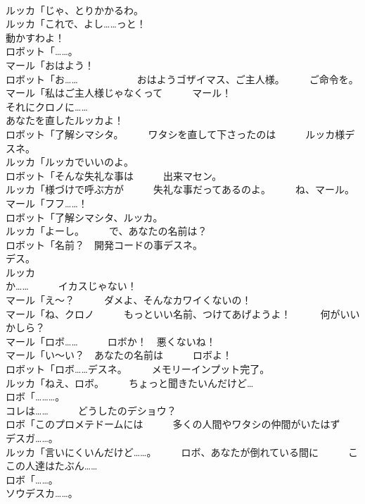 \documentclass[8pt]{extreport}
\begin{document}
\begin{CJK}{UTF8}{min}
\\	ルッカ「じゃ、とりかかるわ。	
\\	ルッカ「これで、よし……っと！	
\\	動かすわよ！	
\\	ロボット「……。	
\\	マール「おはよう！	
\\	ロボット「お……　　　　　　おはようゴザイマス、ご主人様。　　　ご命令を。	
\\	マール「私はご主人様じゃなくって　　　マール！	
\\	それにクロノに……	
\\	あなたを直したルッカよ！	
\\	ロボット「了解シマシタ。　　　ワタシを直して下さったのは　　　ルッカ様デスネ。	
\\	ルッカ「ルッカでいいのよ。	
\\	ロボット「そんな失礼な事は　　　出来マセン。	
\\	ルッカ「様づけで呼ぶ方が　　　失礼な事だってあるのよ。　　　ね、マール。	
\\	マール「フフ……！	
\\	ロボット「了解シマシタ、ルッカ。	
\\	ルッカ「よーし。　　　で、あなたの名前は？	
\\	ロボット「名前？　開発コードの事デスネ。　　　
\\	デス。	
\\	ルッカ
\\	か……　　　イカスじゃない！	
\\	マール「え～？　　　ダメよ、そんなカワイくないの！	
\\	マール「ね、クロノ　　　もっといい名前、つけてあげようよ！　　　何がいいかしら？	
\\	マール「ロボ……　　　ロボか！　悪くないね！	
\\	マール「い～い？　あなたの名前は　　　ロボよ！	
\\	ロボット「ロボ……デスネ。　　　メモリーインプット完了。	
\\	ルッカ「ねえ、ロボ。　　　ちょっと聞きたいんだけど…	
\\	ロボ「………。	
\\	コレは……　　　どうしたのデショウ？	
\\	ロボ「このプロメテドームには　　　多くの人間やワタシの仲間がいたはず　　　デスガ……。	
\\	ルッカ「言いにくいんだけど……。　　　ロボ、あなたが倒れている間に　　　ここの人達はたぶん……	
\\	ロボ「……。	
\\	ソウデスカ……。	

\end{CJK}
\end{document}
